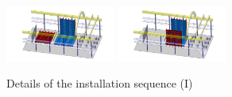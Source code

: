 \begin{figure}[!t]
\includegraphics[width=0.32\textwidth]{./Figures/assembly_sequence_11_07/16.png}
\includegraphics[width=0.32\textwidth]{./Figures/assembly_sequence_11_07/17.png}
\caption{Details of the installation sequence (I)}
\label{fig:Ds20kInstallSequence1}
\end{figure}

